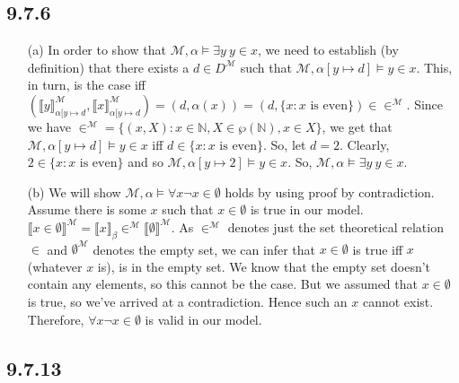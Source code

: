 \subsection*{9.7.6}

\begin{enumerate}

  \item[(a)] In order to show that $\mathcal{M},\alpha\vDash \exists
    y~y\in x$, we need to establish (by definition) that there exists
    a $d\in D^\mathcal{M}$ such that $\mathcal{M},\alpha[y\mapsto
    d]\vDash y\in x$. This, in turn, is the case iff $(\llbracket
    y\rrbracket^\mathcal{M}_{\alpha[y\mapsto d}, \llbracket
    x\rrbracket^\mathcal{M}_{\alpha[y\mapsto d})=(d, \alpha(x))=(d,
    \{x:x\text{ is even}\})\in \in ^\mathcal{M}$. Since we have
    $\in^\mathcal{M}=\{(x,X): x\in \mathbb{N}, X\in \wp(\mathbb{N}),
    x\in X\}$, we get that $\mathcal{M},\alpha[y\mapsto
    d]\vDash y\in x$ iff $d\in \{x:x\text{ is even}\}$. So, let
    $d=2$. Clearly, $2\in \{x:x\text{ is even}\}$ and so $\mathcal{M},\alpha[y\mapsto
    2]\vDash y\in x$. So, $\mathcal{M},\alpha\vDash \exists
    y~y\in x$.

  \item[(b)] We will show $\mathcal{M}, \alpha \vDash \forall x \neg x
    \in \emptyset$ holds by using proof by contradiction. Assume there
    is some $x$ such that $x \in \emptyset$ is true in our
    model. $\llbracket x \in \emptyset \rrbracket^\mathcal{M} =
    \llbracket x \rrbracket_\beta \in^\mathcal{M} \llbracket
    \emptyset\rrbracket^\mathcal{M}$. As $\in^\mathcal{M}$ denotes
    just the set theoretical relation $\in$ and
    $\emptyset^\mathcal{M}$ denotes the empty set, we can infer that
    $x \in \emptyset$ is true iff $x$ (whatever $x$ is), is in the
    empty set. We know that the empty set doesn't contain any
    elements, so this cannot be the case. But we assumed that $x \in
    \emptyset$ is true, so we've arrived at a contradiction. Hence
    such an $x$ cannot exist. Therefore, $\forall x \neg x \in
    \emptyset$ is valid in our model.
\end{enumerate}

\subsection*{9.7.13}

